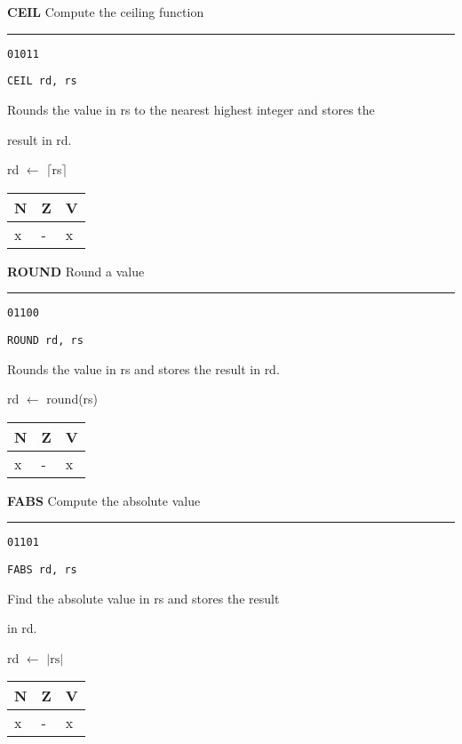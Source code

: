 \documentclass{article}
\begin{document}
\flushleft
\LARGE\textbf{CEIL} \large \hfill Compute the ceiling function

\kern-3pt
\noindent\rule{16.5cm}{0.4pt}
\normalsize

{\large
	 \texttt{01011} \par
	\smallbreak
	 \texttt{CEIL rd, rs} \par
	\smallbreak
	 Rounds the value in rs to the nearest highest integer and stores the \par
	\makebox[3.5cm][l]{  } result in rd. \par
	\smallbreak
	 rd $\leftarrow$ $\lceil$rs$\rceil$ \par
	\smallbreak
	 \begin{tabular}{lll} N \quad & Z \quad & V \\ \hline x & - & x \\ \end{tabular}
}

\bigskip\bigskip

\flushleft
\LARGE\textbf{ROUND} \large \hfill Round a value

\kern-3pt
\noindent\rule{16.5cm}{0.4pt}
\normalsize

{\large
	 \texttt{01100} \par
	\smallbreak
	 \texttt{ROUND rd, rs} \par
	\smallbreak
	 Rounds the value in rs and stores the result in rd. \par
	\smallbreak
	 rd $\leftarrow$ round(rs) \par
	\smallbreak
	 \begin{tabular}{lll} N \quad & Z \quad & V \\ \hline x & - & x \\ \end{tabular}
}

\bigskip\bigskip

\flushleft
\LARGE\textbf{FABS} \large \hfill Compute the absolute value

\kern-3pt
\noindent\rule{16.5cm}{0.4pt}
\normalsize

{\large
	 \texttt{01101} \par
	\smallbreak
	 \texttt{FABS rd, rs} \par
	\smallbreak
	 Find the absolute value in rs and stores the result \par
	\makebox[3.5cm][l]{  } in rd. \par
	\smallbreak
	 rd $\leftarrow$ $|\textrm{rs}|$ \par
	\smallbreak
	 \begin{tabular}{lll} N \quad & Z \quad & V \\ \hline x & - & x \\ \end{tabular}
}
\end{document}
